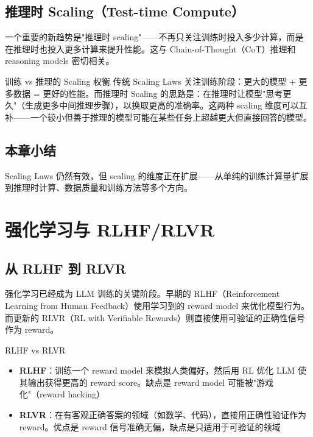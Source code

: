 \documentclass[a4paper]{article}
\begin{document}
\subsection{推理时 Scaling（Test-time Compute）}

一个重要的新趋势是"推理时 scaling"——不再只关注训练时投入多少计算，而是在推理时也投入更多计算来提升性能。这与 Chain-of-Thought（CoT）推理和 reasoning models 密切相关。

\begin{knowledgebox}{训练 vs 推理的 Scaling 权衡}
传统 Scaling Laws 关注训练阶段：更大的模型 + 更多数据 = 更好的性能。而推理时 Scaling 的思路是：在推理时让模型"思考更久"（生成更多中间推理步骤），以换取更高的准确率。这两种 scaling 维度可以互补——一个较小但善于推理的模型可能在某些任务上超越更大但直接回答的模型。
\end{knowledgebox}

\subsection{本章小结}

Scaling Laws 仍然有效，但 scaling 的维度正在扩展——从单纯的训练计算量扩展到推理时计算、数据质量和训练方法等多个方向。

\section{强化学习与 RLHF/RLVR}

\subsection{从 RLHF 到 RLVR}

强化学习已经成为 LLM 训练的关键阶段。早期的 RLHF（Reinforcement Learning from Human Feedback）使用学习到的 reward model 来优化模型行为。而更新的 RLVR（RL with Verifiable Rewards）则直接使用可验证的正确性信号作为 reward。

\begin{importantbox}{RLHF vs RLVR}
\begin{itemize}
    \item \textbf{RLHF}：训练一个 reward model 来模拟人类偏好，然后用 RL 优化 LLM 使其输出获得更高的 reward score。缺点是 reward model 可能被"游戏化"（reward hacking）
    \item \textbf{RLVR}：在有客观正确答案的领域（如数学、代码），直接用正确性验证作为 reward。优点是 reward 信号准确无偏，缺点是只适用于可验证的领域
\end{itemize}
\end{importantbox}
\end{document}
